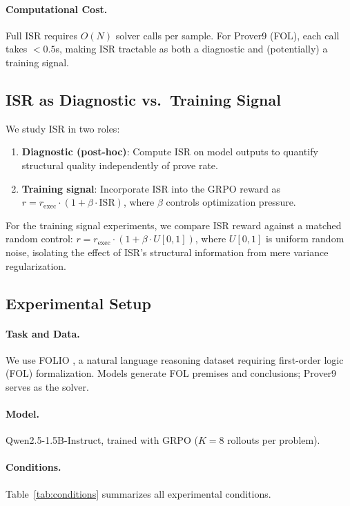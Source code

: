 \documentclass[11pt,a4paper]{article}
\begin{document}
\paragraph{Computational Cost.}
Full ISR requires $O(N)$ solver calls per sample.
For Prover9 (FOL), each call takes $< 0.5$s, making ISR tractable as both a diagnostic and (potentially) a training signal.

\subsection{ISR as Diagnostic vs.\ Training Signal}

We study ISR in two roles:
\begin{enumerate}
    \item \textbf{Diagnostic (post-hoc)}: Compute ISR on model outputs to quantify structural quality independently of prove rate.
    \item \textbf{Training signal}: Incorporate ISR into the GRPO reward as $r = r_{\text{exec}} \cdot (1 + \beta \cdot \text{ISR})$, where $\beta$ controls optimization pressure.
\end{enumerate}

For the training signal experiments, we compare ISR reward against a matched random control: $r = r_{\text{exec}} \cdot (1 + \beta \cdot U[0,1])$, where $U[0,1]$ is uniform random noise, isolating the effect of ISR's structural information from mere variance regularization.

\subsection{Experimental Setup}

\paragraph{Task and Data.}
We use FOLIO \cite{han2022folio}, a natural language reasoning dataset requiring first-order logic (FOL) formalization.
Models generate FOL premises and conclusions; Prover9 serves as the solver.

\paragraph{Model.}
Qwen2.5-1.5B-Instruct, trained with GRPO ($K{=}8$ rollouts per problem).

\paragraph{Conditions.}
Table~\ref{tab:conditions} summarizes all experimental conditions.
\end{document}
